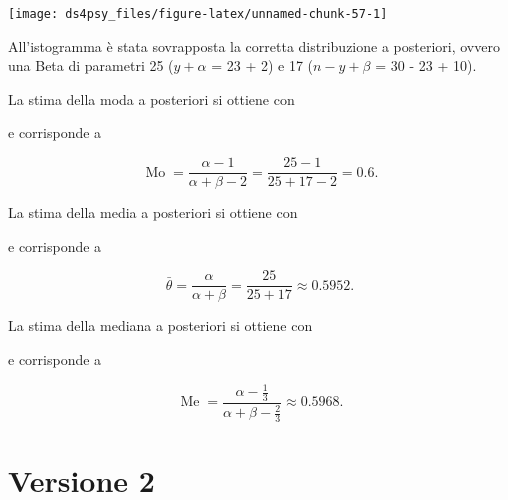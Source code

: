 \documentclass[
  11pt,
]{krantz}
\makeatletter
\newenvironment{Shaded}{\begin{snugshade}}{\end{snugshade}}
\newcommand{\CommentTok}[1]{\textcolor[rgb]{0.37,0.37,0.37}{\textit{#1}}}
\newcommand{\FunctionTok}[1]{\textcolor[rgb]{0,0,0}{#1}}
\newcommand{\NormalTok}[1]{#1}
\newcommand{\SpecialCharTok}[1]{\textcolor[rgb]{0,0,0}{#1}}
\newenvironment{kframe}{%
\medskip{}
\setlength{\fboxsep}{.8em}
 \def\at@end@of@kframe{}%
 \ifinner\ifhmode%
  \def\at@end@of@kframe{\end{minipage}}%
  \begin{minipage}{\columnwidth}%
 \fi\fi%
 \def\FrameCommand##1{\hskip\@totalleftmargin \hskip-\fboxsep
 \colorbox{shadecolor}{##1}\hskip-\fboxsep
     \hskip-\linewidth \hskip-\@totalleftmargin \hskip\columnwidth}%
 \MakeFramed {\advance\hsize-\width
   \@totalleftmargin\z@ \linewidth\hsize
   \@setminipage}}%
 {\par\unskip\endMakeFramed%
 \at@end@of@kframe}
\renewenvironment{Shaded}{\begin{kframe}}{\end{kframe}}
\DeclareMathOperator{\Me}{Me} %
\DeclareMathOperator{\Mo}{Mo} %
\theoremstyle{definition}
\theoremstyle{definition}
\theoremstyle{definition}
\theoremstyle{definition}
\theoremstyle{remark}
\makeatother
\begin{document}
\begin{center}\texttt{[image: ds4psy\_files/figure-latex/unnamed-chunk-57-1]} \end{center}

\noindent All'istogramma è stata sovrapposta la corretta distribuzione a posteriori, ovvero una Beta di parametri 25 (\(y + \alpha\) = 23 + 2) e 17 (\(n - y + \beta\) = 30 - 23 + 10).

La stima della moda a posteriori si ottiene con

\begin{Shaded}
\end{Shaded}

e corrisponde a

\[
\Mo = \frac{\alpha -1}{\alpha + \beta - 2} = \frac{25 - 1}{25 + 17 - 2} = 0.6.
\]

La stima della media a posteriori si ottiene con

\begin{Shaded}
\end{Shaded}

e corrisponde a

\[
\bar{\theta} = \frac{\alpha}{\alpha + \beta} = \frac{25}{25 + 17} \approx 0.5952.
\]

La stima della mediana a posteriori si ottiene con

\begin{Shaded}
\end{Shaded}

e corrisponde a

\[
\Me = \frac{\alpha - \frac{1}{3}}{\alpha + \beta - \frac{2}{3}} \approx 0.5968.
\]

\hypertarget{es-pratico-zetsche-funzioni}{%
\section{Versione 2}\label{es-pratico-zetsche-funzioni}}
\end{document}
